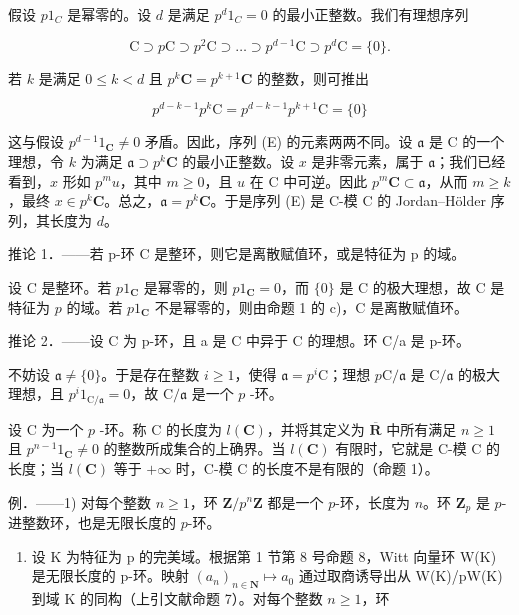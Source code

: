 假设 \(p1_{C}\) 是幂零的。设 \(d\) 是满足 \(p^{d}1_{C} = 0\) 的最小正整数。我们有理想序列

\[
\mathrm{C} \supset p \mathrm{C} \supset p ^ {2} \mathrm{C} \supset \dots \supset p ^ {d - 1} \mathrm{C} \supset p ^ {d} \mathrm{C} = \{0 \}.\tag{E}
\]

若 \(k\) 是满足 \(0 \leqslant k < d\) 且 \(p^k\mathbf{C} = p^{k+1}\mathbf{C}\) 的整数，则可推出

\[
p ^ {d - k - 1} p ^ {k} \mathrm{C} = p ^ {d - k - 1} p ^ {k + 1} \mathrm{C} = \{0 \}
\]

这与假设 \(p^{d-1}1_{\mathbf{C}} \neq 0\) 矛盾。因此，序列 (E) 的元素两两不同。设 \(\mathfrak{a}\) 是 C 的一个理想，令 \(k\) 为满足 \(\mathfrak{a} \supset p^k\mathbf{C}\) 的最小正整数。设 \(x\) 是非零元素，属于 \(\mathfrak{a}\)；我们已经看到，\(x\) 形如 \(p^m u\)，其中 \(m \geqslant 0\)，且 \(u\) 在 C 中可逆。因此 \(p^m\mathbf{C} \subset \mathfrak{a}\)，从而 \(m \geqslant k\)，最终 \(x \in p^k\mathbf{C}\)。总之，\(\mathfrak{a} = p^k\mathbf{C}\)。于是序列 (E) 是 C-模 C 的 Jordan–Hölder 序列，其长度为 \(d\)。

推论 1．——若 p-环 C 是整环，则它是离散赋值环，或是特征为 p 的域。

设 C 是整环。若 \(p1_{\mathbf{C}}\) 是幂零的，则 \(p1_{\mathbf{C}} = 0\)，而 \(\{0\}\) 是 C 的极大理想，故 C 是特征为 \(p\) 的域。若 \(p1_{\mathbf{C}}\) 不是幂零的，则由命题 1 的 c)，C 是离散赋值环。

推论 2．——设 C 为 p-环，且 a 是 C 中异于 C 的理想。环 C/a 是 p-环。

不妨设 \(\mathfrak{a} \neq \{0\}\)。于是存在整数 \(i \geqslant 1\)，使得 \(\mathfrak{a} = p^i\mathrm{C}\)；理想 \(p\mathrm{C} / \mathfrak{a}\) 是 \(\mathrm{C} / \mathfrak{a}\) 的极大理想，且 \(p^i1_{\mathrm{C} / \mathfrak{a}} = 0\)，故 \(\mathrm{C} / \mathfrak{a}\) 是一个 \(p\) -环。

设 C 为一个 \(p\) -环。称 C 的长度为 \(l(\mathbf{C})\)，并将其定义为 \(\overline{\mathbf{R}}\) 中所有满足 \(n \geqslant 1\) 且 \(p^{n-1}1_{\mathbf{C}} \neq 0\) 的整数所成集合的上确界。当 \(l(\mathbf{C})\) 有限时，它就是 C-模 C 的长度；当 \(l(\mathbf{C})\) 等于 \(+\infty\) 时，C-模 C 的长度不是有限的（命题 1）。

例．——1) 对每个整数 \(n \geqslant 1\)，环 \(\mathbf{Z}/p^{n}\mathbf{Z}\) 都是一个 \(p\)-环，长度为 \(n\)。环 \(\mathbf{Z}_{p}\) 是 \(p\)-进整数环，也是无限长度的 \(p\)-环。

\begin{enumerate}
\def\labelenumi{\arabic{enumi})}
\setcounter{enumi}{1}
\tightlist
\item
  设 K 为特征为 p 的完美域。根据第 1 节第 8 号命题 8，Witt 向量环 W(K) 是无限长度的 p-环。映射 \((a_{n})_{n\in\mathbf{N}} \mapsto a_{0}\) 通过取商诱导出从 W(K)/pW(K) 到域 K 的同构（上引文献命题 7）。对每个整数 \(n \geqslant 1\)，环
\end{enumerate}

